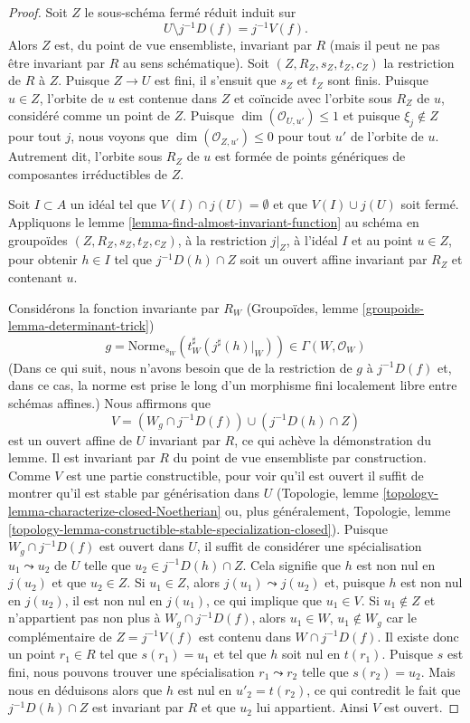 \begin{proof}
\medskip\noindent
Soit $Z$ le sous-schéma fermé réduit induit sur
$$
U \setminus j^{-1}D(f) = j^{-1}V(f).
$$
Alors $Z$ est, du point de vue ensembliste,
invariant par $R$ (mais il peut ne pas être invariant par $R$ au sens schématique).
Soit $(Z, R_Z, s_Z, t_Z, c_Z)$ la restriction de $R$ à $Z$.
Puisque $Z \to U$ est fini, il s'ensuit que $s_Z$ et $t_Z$ sont finis.
Puisque $u \in Z$, l'orbite de $u$ est contenue dans $Z$ et coïncide avec
l'orbite sous $R_Z$ de $u$, considéré comme un point de $Z$. Puisque
$\dim(\mathcal{O}_{U, u'}) \leq 1$ et puisque $\xi_j \not \in Z$
pour tout $j$, nous voyons que $\dim(\mathcal{O}_{Z, u'}) \leq 0$ pour
tout $u'$ de l'orbite de $u$. Autrement dit, l'orbite sous $R_Z$ de $u$
est formée de points génériques de composantes irréductibles de $Z$.

\medskip\noindent
Soit $I \subset A$ un idéal tel que $V(I) \cap j(U) =\emptyset$
et que $V(I) \cup j(U)$ soit fermé. Appliquons
le lemme \ref{lemma-find-almost-invariant-function} au
schéma en groupoïdes $(Z, R_Z, s_Z, t_Z, c_Z)$, à la restriction $j|_Z$,
à l'idéal $I$ et au point $u \in Z$, pour obtenir $h \in I$ tel que
$j^{-1}D(h) \cap Z$ soit un ouvert affine invariant par $R_Z$ et contenant $u$.

\medskip\noindent
Considérons la fonction invariante par $R_W$ (Groupoïdes, lemme
\ref{groupoids-lemma-determinant-trick})
$$
g = 
\text{Norme}_{s_W}(t_W^\sharp(j^\sharp(h)|_W)) \in \Gamma(W, \mathcal{O}_W)
$$
(Dans ce qui suit, nous n'avons besoin que de la restriction de $g$ à $j^{-1}D(f)$ et,
dans ce cas, la norme est prise le long d'un morphisme fini localement libre entre schémas affines.)
Nous affirmons que
$$
V = (W_g \cap j^{-1}D(f)) \cup (j^{-1}D(h) \cap Z)
$$
est un ouvert affine de $U$ invariant par $R$, ce qui achève la démonstration du lemme.
Il est invariant par $R$ du point de vue ensembliste par construction. Comme $V$ est une
partie constructible, pour voir qu'il est ouvert il suffit de montrer qu'il est
stable par générisation dans $U$ (Topologie, lemme
\ref{topology-lemma-characterize-closed-Noetherian}
ou, plus généralement,
Topologie, lemme
\ref{topology-lemma-constructible-stable-specialization-closed}).
Puisque $W_g \cap j^{-1}D(f)$ est ouvert dans $U$, il suffit de considérer
une spécialisation $u_1 \leadsto u_2$ de $U$ telle que
$u_2 \in j^{-1}D(h) \cap Z$.
Cela signifie que $h$ est non nul en $j(u_2)$ et que $u_2 \in Z$.
Si $u_1 \in Z$, alors $j(u_1) \leadsto j(u_2)$ et, puisque
$h$ est non nul en $j(u_2)$, il est non nul en $j(u_1)$, ce qui
implique que $u_1 \in V$. Si $u_1 \not \in Z$ et n'appartient pas non plus
à $W_g \cap j^{-1}D(f)$, alors $u_1 \in W$, $u_1 \not \in W_g$
car le complémentaire de $Z = j^{-1}V(f)$ est contenu dans $W \cap j^{-1}D(f)$.
Il existe donc un point $r_1 \in R$ tel que $s(r_1) = u_1$
et tel que $h$ soit nul en $t(r_1)$. Puisque $s$ est fini, nous
pouvons trouver une spécialisation $r_1 \leadsto r_2$ telle que $s(r_2) = u_2$.
Mais nous en déduisons alors que $h$ est nul en $u'_2 = t(r_2)$,
ce qui contredit le fait que $j^{-1}D(h) \cap Z$ est
invariant par $R$ et que $u_2$ lui appartient. Ainsi $V$ est ouvert.


\end{proof}
